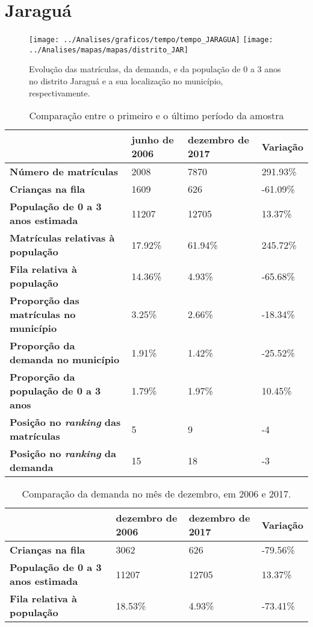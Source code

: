 \section{Jaraguá}
\begin{figure}[H]
	\centering
	\texttt{[image: ../Analises/graficos/tempo/tempo\_JARAGUA]}
	\texttt{[image: ../Analises/mapas/mapas/distrito\_JAR]}
	\caption{Evolução das matrículas, da demanda, e da população de 0 a 3 anos no distrito Jaraguá e a sua localização no município, respectivamente.}
\end{figure}
\begin{table}[H]
	\begin{tabular}{|l|l|l|l|}
		\hline
		\textbf{}                                      & \textbf{junho de 2006}       & \textbf{dezembro de 2017}    & \textbf{Variação} \\ \hline
		\textbf{Número de matrículas}                  & 2008 & 7870 & 291.93\% \\ \hline
		\textbf{Crianças na fila}                      & 1609 & 626 & -61.09\% \\ \hline
		\textbf{População de 0 a 3 anos estimada}      & 11207 & 12705 & 13.37\% \\ \hline
		\textbf{Matrículas relativas à população}      & 17.92\% & 61.94\% & 245.72\% \\ \hline
		\textbf{Fila relativa à população}             & 14.36\% & 4.93\% & -65.68\% \\ \hline
		\textbf{Proporção das matrículas no município} & 3.25\% & 2.66\% & -18.34\% \\ \hline
		\textbf{Proporção da demanda no município}     & 1.91\% & 1.42\% & -25.52\% \\ \hline
		\textbf{Proporção da população de 0 a 3 anos}  & 1.79\% & 1.97\% & 10.45\% \\ \hline
		\textbf{Posição no \textit{ranking} das matrículas}     & 5 & 9 & -4 \\ \hline
		\textbf{Posição no \textit{ranking} da demanda}         & 15 & 18 & -3 \\ \hline
	\end{tabular}
	\caption{Comparação entre o primeiro e o último período da amostra}
\end{table}
\begin{table}[H]
	\begin{tabular}{|l|l|l|l|}
		\hline
		\textbf{}                                 & \textbf{dezembro de 2006} & \textbf{dezembro de 2017} & \textbf{Variação} \\ \hline
		\textbf{Crianças na fila}                      & 3062 & 626 & -79.56\% \\ \hline
		\textbf{População de 0 a 3 anos estimada}      & 11207 & 12705 & 13.37\% \\ \hline
		\textbf{Fila relativa à população}             & 18.53\% & 4.93\% & -73.41\% \\ \hline
	\end{tabular}
	\caption{Comparação da demanda no mês de dezembro, em 2006 e 2017.}
\end{table}
